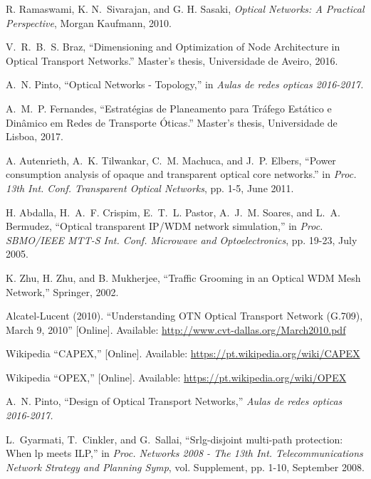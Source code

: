 \begin{thebibliography}{10}
R. Ramaswami, K. N.~Sivarajan, and G. H. Sasaki, \emph{Optical Networks: A Practical Perspective}, Morgan Kaufmann, 2010.

V.~R.~B.~S. Braz, ``Dimensioning and Optimization of Node Architecture in Optical Transport Networks.'' Master's thesis, Universidade de Aveiro, 2016.

A.~N. Pinto, ``Optical Networks - Topology,'' in \emph{Aulas de redes opticas 2016-2017.}

A.~M.~P. Fernandes, ``Estratégias de Planeamento para Tráfego Estático e Dinâmico em Redes de Transporte Óticas.'' Master's thesis, Universidade de Lisboa, 2017.

A. Autenrieth, A.~K. Tilwankar, C.~M. Machuca, and J.~P. Elbers, ``Power consumption analysis of opaque and transparent optical core networks.'' in \emph{Proc. 13th Int. Conf. Transparent Optical Networks}, pp. 1-5, June 2011.

H. Abdalla, H.~A.~F. Crispim, E.~T.~L. Pastor, A.~J.~M. Soares, and L.~A. Bermudez, ``Optical transparent IP/WDM network simulation,'' in \emph{Proc. SBMO/IEEE MTT-S Int. Conf. Microwave and Optoelectronics}, pp. 19-23, July 2005.

K. Zhu, H. Zhu, and B. Mukherjee, ``Traffic Grooming in an Optical WDM Mesh Network,'' Springer, 2002.

\BIBentryALTinterwordspacing
Alcatel-Lucent (2010). ``Understanding OTN Optical Transport Network (G.709), March 9, 2010'' [Online]. Available:
  \url{http://www.cvt-dallas.org/March2010.pdf}
\BIBentrySTDinterwordspacing

\BIBentryALTinterwordspacing
Wikipedia ``CAPEX,'' [Online]. Available: \url{https://pt.wikipedia.org/wiki/CAPEX}
\BIBentrySTDinterwordspacing

\BIBentryALTinterwordspacing
Wikipedia ``OPEX,'' [Online]. Available: \url{https://pt.wikipedia.org/wiki/OPEX}
\BIBentrySTDinterwordspacing

A.~N. Pinto, ``Design of Optical Transport Networks,'' \emph{Aulas de redes opticas 2016-2017.}

L.~Gyarmati, T.~Cinkler, and G.~Sallai, ``Srlg-disjoint multi-path protection: When lp meets ILP,'' in \emph{Proc. Networks 2008 - The 13th Int. Telecommunications Network Strategy and Planning Symp}, vol. Supplement, pp. 1-10, September 2008.


\end{thebibliography}

